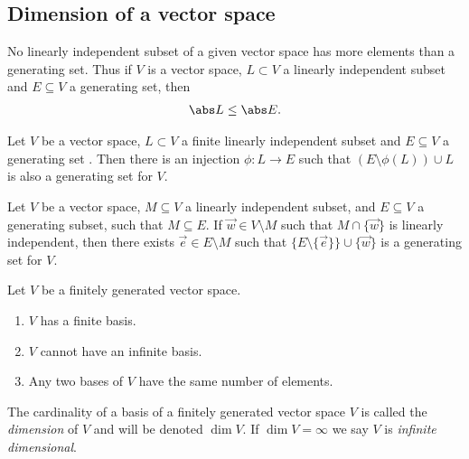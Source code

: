 \documentclass{article}
\begin{document}
\subsection{Dimension of a vector space}

\begin{theorem}
	No linearly independent subset of a given vector space has more elements than
	a generating set. Thus if $V$ is a vector space, $L\subset V$ a linearly independent
	subset and $E\subseteq V$ a generating set, then \begin{align*}
		\abs L \leq \abs E.
	\end{align*}
\end{theorem}

\begin{theorem}
	Let $V$ be a vector space, $L\subset V$ a finite linearly independent subset
	and $E\subseteq V$ a generating set . Then there is an injection $\phi:L\to E$
	such that $(E\setminus\phi(L))\cup L$ is also a generating set for $V$.
\end{theorem}

\begin{lemma}
	Let $V$ be a vector space, $M\subseteq V$ a linearly independent subset, and
	$E\subseteq V$ a generating subset, such that $M\subseteq E$. If $\vec w\in V\setminus M$
	such that $M\cap\{\vec w\}$ is linearly independent, then there exists
	$\vec e\in E\setminus M$ such that $\{E\setminus\{\vec e\}\}\cup \{\vec w\}$ is a
	generating set for $V$.
\end{lemma}

\begin{corollary}[Corollary 1.6.4]
	Let $V$ be a finitely generated vector space.
	\begin{enumerate}
		\item $V$ has a finite basis.
		\item $V$ cannot have an infinite basis.
		\item Any two bases of $V$ have the same number of elements.
	\end{enumerate}
\end{corollary}

\begin{definition}
	The cardinality of a basis of a finitely generated vector space $V$
	is called the \emph{dimension} of $V$ and will be denoted $\dim V$.
	If $\dim V=\infty$ we say $V$ is \emph{infinite dimensional}.
\end{definition}
\end{document}
